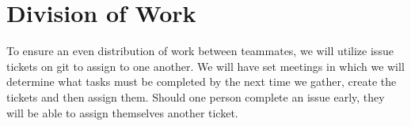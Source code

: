 \documentclass[11pt]{article}
\begin{document}
\section{Division of Work}
To ensure an even distribution of work between teammates, we will utilize issue tickets on git to assign to one another. We will have set meetings in which 
we will determine what tasks must be completed by the next time we gather, create the tickets and then assign them. Should one person complete an issue early, 
they will be able to assign themselves another ticket.
\end{document}
